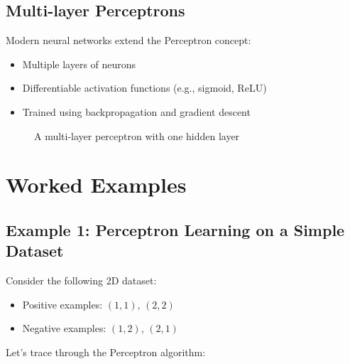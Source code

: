 \documentclass{article}
\begin{document}
\subsection{Multi-layer Perceptrons}
Modern neural networks extend the Perceptron concept:
\begin{itemize}
    \item Multiple layers of neurons
    \item Differentiable activation functions (e.g., sigmoid, ReLU)
    \item Trained using backpropagation and gradient descent
\end{itemize}

\begin{figure}[h]
\centering
{}
\caption{A multi-layer perceptron with one hidden layer}
\end{figure}

\section{Worked Examples}

\subsection{Example 1: Perceptron Learning on a Simple Dataset}
Consider the following 2D dataset:
\begin{itemize}
    \item Positive examples: $(1,1)$, $(2,2)$
    \item Negative examples: $(1,2)$, $(2,1)$
\end{itemize}

Let's trace through the Perceptron algorithm:
\end{document}

